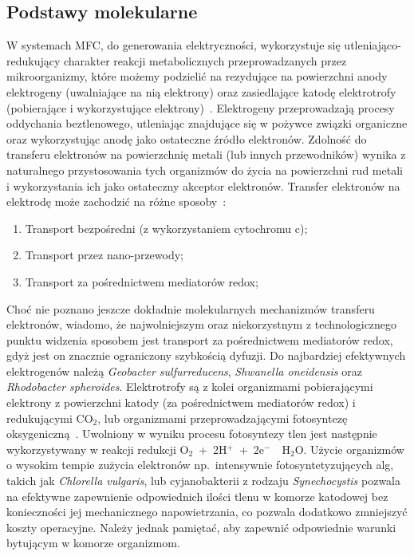 \subsection{Podstawy molekularne}\label{subsec:podstawy-molekularne}
W systemach MFC, do generowania elektryczności, wykorzystuje się
utleniająco-redukujący charakter reakcji metabolicznych
przeprowadzanych przez mikroorganizmy, które możemy podzielić
na rezydujące na powierzchni anody elektrogeny (uwalniające na nią
elektrony) oraz zasiedlające katodę elektrotrofy
(pobierające i wykorzystujące elektrony)~\cite{AlSayed2020}.
Elektrogeny przeprowadzają procesy oddychania beztlenowego,
utleniając znajdujące się w pożywce związki organiczne oraz
wykorzystując anodę jako ostateczne źródło elektronów.
Zdolność do transferu elektronów na powierzchnię metali (lub
innych przewodników) wynika z naturalnego przystosowania tych
organizmów do życia na powierzchni rud metali i wykorzystania
ich jako ostateczny akceptor elektronów.
Transfer elektronów na elektrodę może zachodzić na różne
sposoby~\cite{Santoro2017}:

\begin{enumerate}
    \item Transport bezpośredni (z wykorzystaniem cytochromu c);
    \item Transport przez nano-przewody;
    \item Transport za pośrednictwem mediatorów redox;
\end{enumerate}

Choć nie poznano jeszcze dokładnie molekularnych mechanizmów
transferu elektronów, wiadomo, że najwolniejszym oraz
niekorzystnym z technologicznego punktu widzenia sposobem jest
transport za pośrednictwem mediatorów redox, gdyż jest on znacznie
ograniczony szybkością dyfuzji.
Do najbardziej efektywnych elektrogenów należą \textit{Geobacter sulfurreducens},
\textit{Shwanella oneidensis} oraz \textit{Rhodobacter spheroides}.
Elektrotrofy są z kolei organizmami pobierającymi elektrony z powierzchni
katody (za pośrednictwem mediatorów redox) i redukującymi CO$_2$,
lub organizmami przeprowadzającymi fotosyntezę oksygeniczną~\cite{Santoro2017, Reddy2019}.
Uwolniony w wyniku procesu fotosyntezy tlen jest następnie wykorzystywany w reakcji
redukcji O$_2$~+~2H$^+$~+~2e$^-$~\textrightarrow~H$_2$O\@.
Użycie organizmów o wysokim tempie zużycia elektronów np.\ intensywnie
fotosyntetyzujących alg, takich jak \textit{Chlorella vulgaris}, lub cyjanobakterii
z rodzaju \textit{Synechocystis} pozwala na efektywne zapewnienie odpowiednich
ilości tlenu w komorze katodowej bez konieczności jej mechanicznego napowietrzania,
co pozwala dodatkowo zmniejszyć koszty operacyjne.
Należy jednak pamiętać, aby zapewnić odpowiednie warunki bytującym w komorze organizmom.